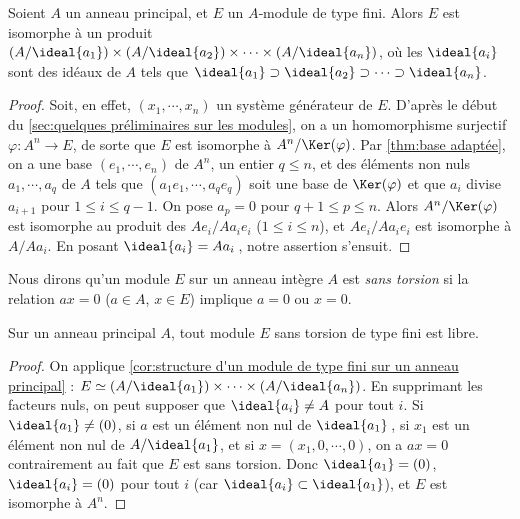 \documentclass[11pt, useosf,
  title in boldface,
  theorem in new line,
  theorem numbering = section,
  number theorems separately,
]{simplivre}
\begin{document}
\enlargethispage*{\baselineskip}
    \begin{corollary}\label{cor:structure d'un module de type fini sur un anneau principal}
        Soient \( A \) un anneau principal, et \( E \) un \( A \)‑module de type fini. Alors \( E \) est isomorphe à un produit \( (A/\ideal{a_1}) \times (A/\ideal{a_2}) \times \cdots \times (A/\ideal{a_n}) \), où les \( \ideal{a_i} \) sont des idéaux de \( A \) tels que \( \ideal{a_1} \supset \ideal{a_2} \supset \cdots \supset \ideal{a_n} \).
    \end{corollary}
    \begin{proof}
        Soit, en effet, \( (x_1, \cdots, x_n) \) un système générateur de \( E \). D'après le début du \cref{sec:quelques préliminaires sur les modules}, on a un homomorphisme surjectif \( \varphi \colon A^n \to E \), de sorte que \( E \) est isomorphe à \( A^n/\Ker(\varphi) \). Par \cref{thm:base adaptée}, on a une base \( (e_1, \cdots, e_n) \) de \( A^n \), un entier \( q \leqslant n \), et des éléments non nuls \( a_1, \cdots, a_q \) de \( A \) tels que \( (a_1 e_1, \cdots, a_q e_q) \) soit une base de \( \Ker(\varphi) \) et que \( a_i \) divise \( a_{i+1} \) pour \( 1 \leqslant i \leqslant q-1 \). On pose \( a_p = 0 \) pour \( q+1 \leqslant p \leqslant n \). Alors \( A^n/\Ker(\varphi) \) est isomorphe au produit des \( A e_i / A a_i e_i \) (\( 1 \leqslant i \leqslant n \)), et \( A e_i / A a_i e_i \) est isomorphe à \( A / A a_i \). En posant \( \ideal{a_i} = A a_i \)\,, notre assertion s'ensuit.
    \end{proof}

    Nous dirons qu'un module \( E \) sur un anneau intègre \( A \) est \emph{sans torsion} si la relation \( ax=0 \) (\( a \in A \), \( x \in E \)) implique \( a = 0 \) ou \( x = 0 \).

    \begin{corollary}
        Sur un anneau principal \( A \), tout module \( E \) sans torsion de type fini est libre.
    \end{corollary}
    \begin{proof}
        On applique \cref{cor:structure d'un module de type fini sur un anneau principal} : \( E \simeq (A/\ideal{a_1}) \times \cdots \times (A/\ideal{a_n}) \). En supprimant les facteurs nuls, on peut supposer que \( \ideal{a_i} \neq A \) pour tout \( i \). Si \( \ideal{a_1} \neq (0) \), si \( a \) est un élément non nul de \( \ideal{a_1} \)\,, si \( x_1 \) est un élément non nul de \( A/\ideal{a_1} \), et si \( x = (x_1, 0, \cdots, 0) \), on a \( ax = 0 \) contrairement au fait que \( E \) est sans torsion. Donc \( \ideal{a_1} = (0) \), \( \ideal{a_i} = (0) \) pour tout \( i \) (car \( \ideal{a_i} \subset \ideal{a_1} \)), et \( E \) est isomorphe à \( A^n \).
    \end{proof}
\end{document}
